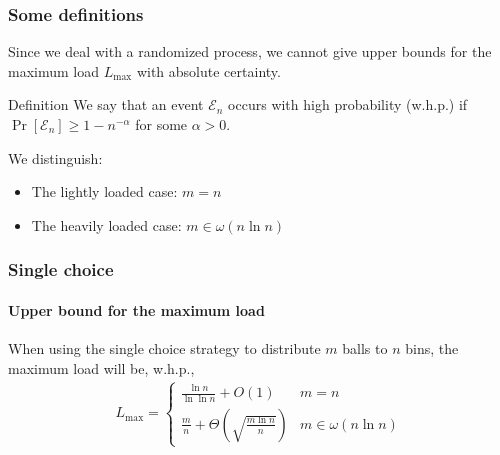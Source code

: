 \documentclass[serif,professionalfonts]{beamer}
\newcommand\load{L_{\mathrm{max}}}
\begin{document}
\begin{frame}
\frametitle{Some definitions}

Since we deal with a \alert{randomized process}, we cannot give upper bounds for the maximum load $\load$ with absolute certainty. 

\begin{exampleblock}{Definition}
We say that an event $\mathcal E_n$ occurs \alert{with high probability} (w.h.p.) if $\Pr\left[\mathcal E_n \right] \geq 1 - n^{-\alpha}$ for some $\alpha > 0$.
\end{exampleblock}

\bigskip
\pause

We distinguish:
\begin{itemize}
\item The \alert{lightly loaded} case: $m = n$
\item The \alert{heavily loaded} case:	 $m \in \omega(n\ln n)$
\end{itemize}

\end{frame}

\begin{frame}
\frametitle{Single choice}
\framesubtitle{Upper bound for the maximum load}
\begin{theorem}
When using the single choice strategy to distribute $m$ balls to $n$ bins, the maximum load will be, w.h.p.,
\begin{align*}
\load = 
	\begin{cases}
    \frac{\ln n}{\ln\ln n} + O(1)              & m = n \\
    \frac{m}{n} + \Theta\left(\sqrt{\frac{m\ln n}{n}} \right)              & m \in \omega(n \ln n)
    \end{cases}
\end{align*}
\end{theorem}
\end{frame}

\begin{comment}
\AtBeginSection[]
{
  \begin{frame}
    \frametitle{Table of Contents}
    \tableofcontents[currentsection]
  \end{frame}
}
\end{comment}
\end{document}
